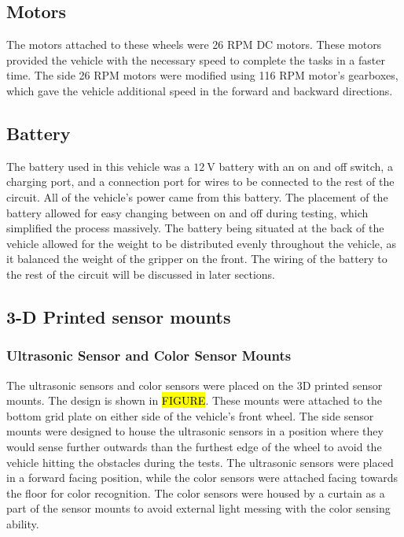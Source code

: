 \documentclass[11pt]{report}
\begin{document}
\subsection{Motors}
The motors attached to these wheels were 26 \gls{RPM} \gls{DC} motors. These motors provided the vehicle with the necessary speed to complete the tasks in a faster time. The side 26 \gls{RPM} motors were modified using 116 \gls{RPM} motor’s gearboxes, which gave the vehicle additional speed in the forward and backward directions. 

\subsection{Battery}
The battery used in this vehicle was a $\SI{12}{\volt}$ battery with an on and off switch, a charging port, and a connection port for wires to be connected to the rest of the circuit. All of the vehicle’s power came from this battery. The placement of the battery allowed for easy changing between on and off during testing, which simplified the process massively. The battery being situated at the back of the vehicle allowed for the weight to be distributed evenly throughout the vehicle, as it balanced the weight of the gripper on the front. The wiring of the battery to the rest of the circuit will be discussed in later sections. 

\subsection{3-D Printed sensor mounts}
\subsubsection{Ultrasonic Sensor and Color Sensor Mounts}
The ultrasonic sensors and color sensors were placed on the 3D printed sensor mounts. The design is shown in \hl{FIGURE}. These mounts were attached to the bottom grid plate on either side of the vehicle’s front wheel. The side sensor mounts were designed to house the ultrasonic sensors in a position where they would sense further outwards than the furthest edge of the wheel to avoid the vehicle hitting the obstacles during the tests. The ultrasonic sensors were placed in a forward facing position, while the color sensors were attached facing towards the floor for color recognition. The color sensors were housed by a curtain as a part of the sensor mounts to avoid external light messing with the color sensing ability.
\end{document}
